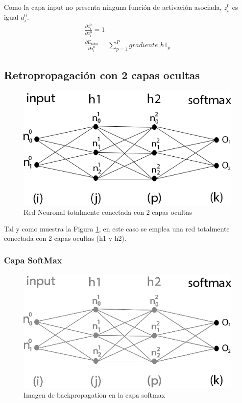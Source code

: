 Como la capa input no presenta ninguna función de activación asociada, $z^0_i$ es igual $a^0_i$. \\

\begin{gather}
	\frac{\partial z^0_i }{\partial a^0_i } = 1 \\
	\frac{\partial E_{total}}{\partial a^0_i} = \sum_{p=1}^{P} gradiente\_h1_p
\end{gather}

\subsection{Retropropagación con 2 capas ocultas}

\begin{figure}[H]
	\centering
	\includegraphics[scale=0.35]{imagenes/nn_2_capas.jpg}  
	\caption{Red Neuronal totalmente conectada con 2 capas ocultas}
	\label{fig:nn_2_capas}
\end{figure}

Tal y como muestra la Figura \ref{fig:nn_2_capas}, en este caso se emplea una red totalmente conectada con 2 capas ocultas (h1 y h2). \\

\subsubsection{Capa SoftMax}

\begin{figure}[H]
	\centering
	\includegraphics[scale=0.35]{imagenes/nn_2_capa_output.jpg}  
	\caption{Imagen de backpropagation en la capa softmax}
\end{figure}

